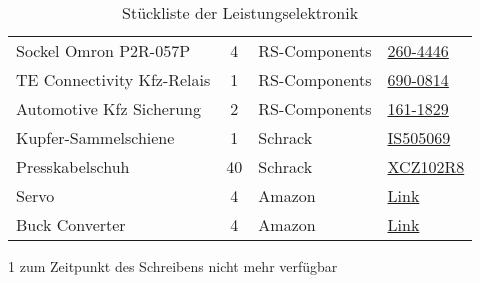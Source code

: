 \begin{table}[h]
\begin{threeparttable}
\begin{tabular}{|l|c|M{3cm}|l|}
    Sockel Omron P2R-057P & 4 & RS-Components & \href{https://at.rs-online.com/web/p/einbaumessgerate-zubehor/2604446/}{260-4446}\\
    TE Connectivity Kfz-Relais & 1 & RS-Components & \href{https://at.rs-online.com/web/p/monostabile-relais/6900814}{690-0814} \\
    Automotive Kfz Sicherung & 2 & RS-Components & \href{https://at.rs-online.com/web/p/kfz-sicherungen/1611829/}{161-1829}\\\hline
    Kupfer-Sammelschiene & 1 & Schrack & \href{https://www.schrack.at/shop/verteilereinbau-ls-fi-ueberspannungsableiter-d0-und-nh/schmelzsicherungs-und-sammelschienensysteme/sammelschienensysteme/sammelschienen/kupfersammelschiene/kupfer-sammelschiene-blank-379-a-450-a-30x5mm-2m-is505069.html}{IS505069}\\
    Presskabelschuh & 40 & Schrack & \href{https://www.schrack.at/shop/kabel-leitungen/presskabelschuh-kabelzubehoer/din-presskabelschuhe/presskabelschuh-10mm2-m8-xcz102r8.html}{XCZ102R8}\\\hline
    Servo & 4 & Amazon & \href{https://www.amazon.de/-/en/gp/product/B07T6DNLV4/}{Link}\\
    Buck Converter & 4 & Amazon & \href{https://www.amazon.de/gp/product/B085DSMFQM/ref=ppx_yo_dt_b_asin_image_o03_s00?ie=UTF8&psc=1}{Link} \\\hline 
    \end{tabular}
    \begin{tablenotes}\footnotesize 
        \item[1] zum Zeitpunkt des Schreibens nicht mehr verfügbar 
    \end{tablenotes}
\end{threeparttable}
    \caption{Stückliste der Leistungselektronik}
\end{table}

\newpage